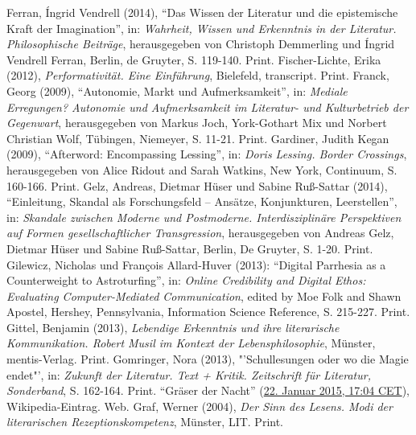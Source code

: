 \documentclass[fontsize=12pt]{scrartcl}
\begin{document}
{{{{\begin{thebibliography}
	Ferran, \'{I}ngrid Vendrell (2014), "`Das Wissen der Li\-te\-ra\-tur und die epistemische Kraft der Imagination"', in: \textit{Wahrheit, Wissen und Erkenntnis in der Li\-te\-ra\-tur. Philosophische Beitr\"age}, he\-rausgegeben von Christoph Demmerling und \'{I}ngrid Vendrell Ferran, Berlin, de Gruyter, S. 119-140. Print.
	Fischer-Lichte, Erika (2012), \textit{Performativit\"at. Eine Einf\"uh\-rung}, Bielefeld, transcript. Print.
	Franck, Georg (2009), "`Autonomie, Markt und Aufmerksamkeit"', in: \textit{Mediale Erregungen? Autonomie und Aufmerksamkeit im Li\-te\-ra\-tur- und Kulturbetrieb der Gegenwart}, he\-rausgegeben von Markus Joch, York-Gothart Mix und Norbert Christian Wolf, T\"ubingen, Niemeyer, S. 11-21. Print.
	Gardiner, Judith Kegan (2009), "`Afterword: Encompassing Lessing"', in: \textit{Doris Lessing. Border Crossings}, he\-rausgegeben von Alice Ridout and Sarah Watkins, New York, Continuum, S. 160-166. Print.
	Gelz, Andreas, Dietmar H\"user und Sabine Ru{\ss}-Sattar (2014), "`Einleitung, Skandal als For\-schungsfeld -- Ans\"atze, Konjunkturen, Leerstellen"', in: \textit{Skan\-da\-le zwi\-schen Moderne und Postmoderne. Interdisziplin\"are Perspektiven auf Formen ge\-sell\-schaftlicher Transgression}, he\-rausgegeben von Andreas Gelz, Dietmar H\"user und Sabine Ru{\ss}-Sattar, Berlin, De Gruyter, S. 1-20. Print.
	Gilewicz, Nicholas und Fran\c{c}ois Allard-Huver (2013): "`Digital Parrhesia as a Counterweight to Astroturfing"', in: \textit{Online Credibility and Digital Ethos: Evaluating Com\-pu\-ter-Mediated Communication}, edited by Moe Folk and Shawn Apostel, Hershey, Pennsylvania, Information Science Reference, S. 215-227. Print.
	Gittel, Benjamin (2013), \textit{Lebendige Erkenntnis und ihre literarische Kommunikation. Robert Musil im Kontext der Lebensphilosophie}, M\"unster, mentis-Verlag. Print.
	Gomringer, Nora (2013), "'Schullesungen oder wo die Magie endet"', in: \textit{Zukunft der Li\-te\-ra\-tur. Text + Kritik. Zeitschrift f\"ur Li\-te\-ra\-tur, Sonderband}, S. 162-164. Print.
	"`Gr\"aser der Nacht"' (\href{https://de.wikipedia.org/w/index.php?title=Gr\%C3\%A4ser_der_Nacht\&oldid=138052609}{22. Januar 2015, 17:04 CET}), Wi\-ki\-pe\-dia-Ein\-trag. Web.
	Graf, Werner (2004), \textit{Der Sinn des Lesens. Modi der li\-te\-ra\-rischen Rezeptionskompetenz}, M\"unster, LIT. Print. 

\end{thebibliography}}}}}
\end{document}
